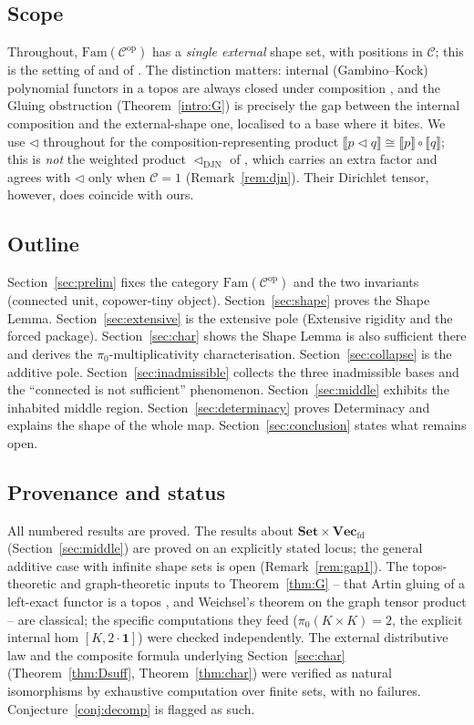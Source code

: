 \documentclass[11pt]{amsart}
\theoremstyle{plain}
\theoremstyle{definition}
\newcommand{\C}{\mathcal{C}}
\newcommand{\Fam}{\mathrm{Fam}}
\newcommand{\ext}[1]{\llbracket #1 \rrbracket}
\newcommand{\Setb}{\mathbf{Set}}
\newcommand{\Vecfd}{\mathbf{Vec}_{\mathrm{fd}}}
\newcommand{\op}{\mathrm{op}}
\newcommand{\comp}{\mathbin{\triangleleft}}
\newcommand{\compDJN}{\mathbin{\triangleleft_{\mathrm{DJN}}}}
\newcommand{\one}{\mathbf{1}}
\newcommand{\pizero}{\pi_0}
\begin{document}
\subsection*{Scope}
Throughout, $\Fam(\C^{\op})$ has a \emph{single external} shape set, with positions in $\C$; this is
the setting of \cite{AAG} and of \cite{DJN}. The distinction matters: internal (Gambino--Kock)
polynomial functors in a topos are always closed under composition \cite{GambinoKock}, and the
Gluing obstruction (Theorem~\ref{intro:G}) is precisely the gap between the internal composition and
the external-shape one, localised to a base where it bites. We use $\comp$ throughout for the
composition-representing product $\ext{p\comp q}\cong\ext p\circ\ext q$; this is \emph{not}
the weighted product $\compDJN$ of \cite{DJN}, which carries an extra factor and agrees with $\comp$
only when $\C=1$ (Remark~\ref{rem:djn}). Their Dirichlet tensor, however, does coincide with ours.

\subsection*{Outline}
Section~\ref{sec:prelim} fixes the category $\Fam(\C^{\op})$ and the two invariants (connected unit,
copower-tiny object). Section~\ref{sec:shape} proves the Shape Lemma. Section~\ref{sec:extensive} is
the extensive pole (Extensive rigidity and the forced package). Section~\ref{sec:char} shows the
Shape Lemma is also sufficient there and derives the $\pizero$-multiplicativity characterisation.
Section~\ref{sec:collapse} is the
additive pole. Section~\ref{sec:inadmissible} collects the three inadmissible bases and the
``connected is not sufficient'' phenomenon. Section~\ref{sec:middle} exhibits the inhabited middle
region. Section~\ref{sec:determinacy} proves Determinacy and explains the shape of the whole map.
Section~\ref{sec:conclusion} states what remains open.

\subsection*{Provenance and status}
All numbered results are proved. The results about $\Setb\times\Vecfd$ (Section~\ref{sec:middle}) are
proved on an explicitly stated locus; the general additive case with infinite shape sets is open
(Remark~\ref{rem:gap1}). The topos-theoretic and graph-theoretic inputs to
Theorem~\ref{thm:G} -- that Artin gluing of a left-exact functor is a topos \cite{MacLaneMoerdijk,
CarboniJohnstone}, and Weichsel's theorem on the graph tensor product \cite{Weichsel} -- are
classical; the specific computations they feed ($\pizero(K\times K)=2$, the explicit internal hom
$[K,2\cdot\one]$) were checked independently. The external distributive law and the composite formula
underlying Section~\ref{sec:char} (Theorem~\ref{thm:Dsuff}, Theorem~\ref{thm:char}) were verified as
natural isomorphisms by exhaustive computation over finite sets, with no failures.
Conjecture~\ref{conj:decomp} is flagged as such.
\end{document}
